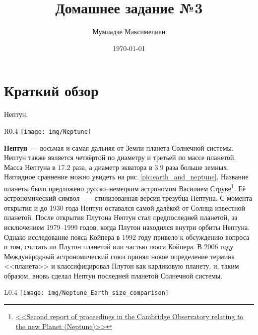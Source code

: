 \documentclass[12pt]{article}
\author{Мумладзе Максимелиан}
\title{Домашнее задание №3}
\date{\today}
\numberwithin{equation}{section} %
\theoremstyle{definition}\newtheorem{defi}{Определение}
\begin{document}
\maketitle

\section{Краткий обзор}
\begin{center}\Huge

Нептун.

\end{center}

\begin{wrapfigure}{R}{0.4\textwidth}
  \vspace{-1pc}
  \center \texttt{[image: img/Neptune]}
  \caption{Нептун с <<Вояджера-2>>.}
\end{wrapfigure}

\textbf{Нептун}~--- восьмая и самая дальняя от Земли планета Солнечной системы. Нептун также является четвёртой по диаметру и третьей по массе планетой. Масса Нептуна в $17.2$ раза, а диаметр экватора в $3.9$ раза больше земных. Наглядное сравнение можно увидеть на рис.\,\ref{pic:earth_and_neptune}. Название планеты было предложено русско--немецким астрономом Василием Струве\footnote{\href{http://articles.adsabs.harvard.edu/full/seri/AN.../0025/0000164.000.html}{<<Second report of proceedings in the Cambridge Observatory relating to the new Planet (Neptune)>>}}. Её астрономический символ \Neptune ~--- стилизованная версия трезубца Нептуна. С момента открытия и до 1930 года Нептун оставался самой далёкой от Солнца известной планетой. После открытия Плутона Нептун стал предпоследней планетой, за исключением 1979--1999 годов, когда Плутон находился внутри орбиты Нептуна. Однако исследование пояса Койпера в 1992 году привело к обсуждению вопроса о том, считать ли Плутон планетой или частью пояса Койпера. В 2006 году Международный астрономический союз принял новое определение термина <<планета>> и классифицировал Плутон как карликовую планету, и, таким образом, вновь сделал Нептун последней планетой Солнечной системы.


\begin{wrapfigure}{L}{0.4\textwidth}
  \vspace{-1pc}
  \center \texttt{[image: img/Neptune\_Earth\_size\_comparison]}
  \caption{Нептун и Земля.}
  \label{pic:earth_and_neptune}
\end{wrapfigure}
\end{document}
